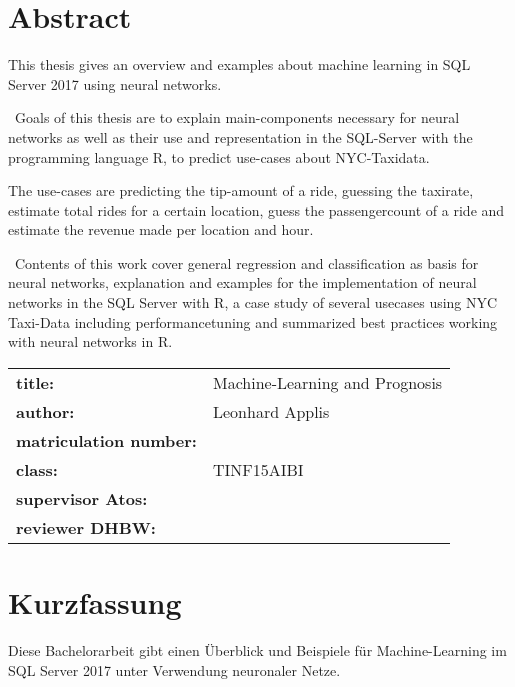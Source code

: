 \chapter*{Abstract} %
This thesis gives an overview and examples about machine learning in SQL Server 2017 using neural networks. 

~\newline Goals of this thesis are to explain main-components necessary for neural networks as well as their use and representation in the SQL-Server with the programming language R, to predict use-cases about NYC-Taxidata. 

The use-cases are predicting the tip-amount of a ride, guessing the taxirate, estimate total rides for a certain location, guess the passengercount of a ride and estimate the revenue made per location and hour.

~\newline Contents of this work cover general regression and classification as basis for neural networks, explanation and examples for the implementation of neural networks in the SQL Server with R, a case study of several usecases using NYC Taxi-Data including performancetuning and summarized best practices working with neural networks in R. 
~\newline
~\newline
\begin{flushleft}
	\begin{tabular}{ll}
		\textbf{title:} &\quad Machine-Learning and Prognosis \\
		\textbf{author:}  &\quad Leonhard Applis \\
		\textbf{matriculation number:} &\quad 2086307 \\
		\textbf{class:} &\quad TINF15AIBI \\
		\textbf{supervisor Atos:} & \quad \betreuerfirma \\
		\textbf{reviewer DHBW:} &\quad \betreuerdhbw \\
		[6ex]%
	\end{tabular} 
\end{flushleft}


\chapter*{Kurzfassung} 
Diese Bachelorarbeit gibt einen Überblick und Beispiele für Machine-Learning im SQL Server 2017 unter Verwendung neuronaler Netze.


